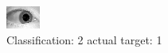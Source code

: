 \begin{figure}[h!]
\begin{center}
\includegraphics[width=0.60\columnwidth]{figures/ID1479_class_2_target_1.png}
\end{center}
\caption{ Classification: 2 actual target: 1}
\label{fig:ID1479_class_2_target_1}
\end{figure}
